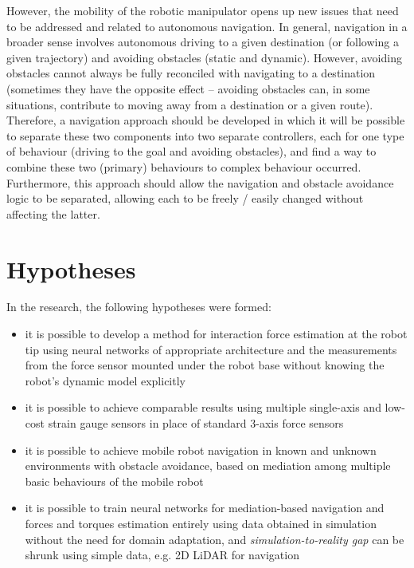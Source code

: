 However, the mobility of the robotic manipulator opens up new issues that need to be addressed and related to autonomous navigation. In general, navigation in a broader sense involves autonomous driving to a given destination (or following a given trajectory) and avoiding obstacles (static and dynamic). However, avoiding obstacles cannot always be fully reconciled with navigating to a destination (sometimes they have the opposite effect -- avoiding obstacles can, in some situations, contribute to moving away from a destination or a given route). Therefore, a navigation approach should be developed in which it will be possible to separate these two components into two separate controllers, each for one type of behaviour (driving to the goal and avoiding obstacles), and find a way to combine these two (primary) behaviours to complex behaviour occurred. Furthermore, this approach should allow the navigation and obstacle avoidance logic to be separated, allowing each to be freely / easily changed without affecting the latter.

\section{Hypotheses}

In the research, the following hypotheses were formed:

\begin{itemize}
    \item it is possible to develop a method for interaction force estimation at the robot tip using neural networks of appropriate architecture and the measurements from the force sensor mounted under the robot base without knowing the robot's dynamic model explicitly
    \item it is possible to achieve comparable results using multiple single-axis and low-cost strain gauge sensors in place of standard 3-axis force sensors
    \item it is possible to achieve mobile robot navigation in known and unknown environments with obstacle avoidance, based on mediation among multiple basic behaviours of the mobile robot
    \item it is possible to train neural networks for mediation-based navigation and forces and torques estimation entirely using data obtained in simulation without the need for domain adaptation, and \emph{simulation-to-reality gap} can be shrunk using simple data, e.g. 2D LiDAR for navigation
\end{itemize}

